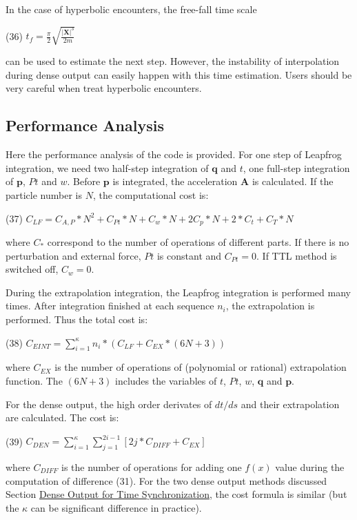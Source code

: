 In the case of hyperbolic encounters, the free-\/fall time scale

(36) $ t_f = \frac{\pi}{2} \sqrt{\frac{|\mathbf{X}|^3}{2 m}} $

can be used to estimate the next step. However, the instability of interpolation during dense output can easily happen with this time estimation. Users should be very careful when treat hyperbolic encounters.\hypertarget{index_perf_sec}{}\subsection{Performance Analysis}\label{index_perf_sec}
Here the performance analysis of the code is provided. For one step of Leapfrog integration, we need two half-\/step integration of $ \mathbf{q} $ and $ t $, one full-\/step integration of $ \mathbf{p} $, $ Pt $ and $ w $. Before $ \mathbf{p} $ is integrated, the acceleration $ \mathbf{A} $ is calculated. If the particle number is $ N $, the computational cost is\+:

(37) $ C_{LF} = C_{A,P}*N^2 + C_{Pt}*N + C_{w}*N + 2C_{p}*N + 2*C_{t} + C_{T}*N $

where $ C_* $ correspond to the number of operations of different parts. If there is no perturbation and external force, $ Pt $ is constant and $ C_{Pt} = 0$. If T\+TL method is switched off, $ C_{w} = 0$.

During the extrapolation integration, the Leapfrog integration is performed many times. After integration finished at each sequence $ n_i $, the extrapolation is performed. Thus the total cost is\+:

(38) $ C_{EINT} = \sum_{i=1}^\kappa n_i*(C_{LF} + C_{EX}*(6N+3))$

where $ C_{EX} $ is the number of operations of (polynomial or rational) extrapolation function. The $ (6N+3) $ includes the variables of $ t $, $ Pt $, $ w $, $ \mathbf{q} $ and $ \mathbf{p} $.

For the dense output, the high order derivates of $ dt/ds $ and their extrapolation are calculated. The cost is\+:

(39) $ C_{DEN} = \sum_{i=1}^\kappa \sum_{j=1}^{2i-1} [2j*C_{DIFF} + C_{EX}] $

where $ C_{DIFF} $ is the number of operations for adding one $ f(x) $ value during the computation of difference (31). For the two dense output methods discussed Section \hyperlink{index_dense_sec}{Dense Output for Time Synchronization}, the cost formula is similar (but the $ \kappa $ can be significant difference in practice).

